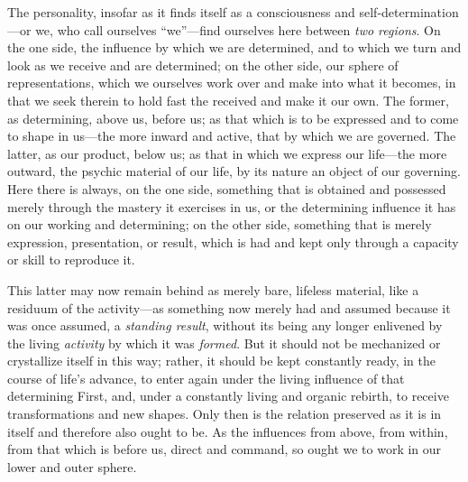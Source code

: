 \documentclass[12pt,a4paper]{book}
\begin{document}
The personality, insofar as it finds itself as a consciousness and
self-determination---or we, who call ourselves ``we''---find ourselves here
between \emph{two regions}. On the one side, the influence by which we are
determined, and to which we turn and look as we receive and are determined; on
the other side, our sphere of representations, which we ourselves work over and
make into what it becomes, in that we seek therein to hold fast the received and
make it our own. The former, as determining, above us, before us; as that which
is to be expressed and to come to shape in us---the more inward and active, that
by which we are governed. The latter, as our product, below us; as that in which
we express our life---the more outward, the psychic material of our life, by its
nature an object of our governing. Here there is always, on the one side,
something that is obtained and possessed merely through the mastery it exercises
in us, or the determining influence it has on our working and determining; on the
other side, something that is merely expression, presentation, or result, which
is had and kept only through a capacity or skill to reproduce it.

This latter may now remain behind as merely bare, lifeless material, like a
residuum of the activity---as something now merely had and assumed because it was
once assumed, a \emph{standing result}, without its being any longer enlivened by
the living \emph{activity} by which it was \emph{formed}. But it should not be
mechanized or crystallize itself in this way; rather, it should be kept
constantly ready, in the course of life's advance, to enter again under the
living influence of that determining First, and, under a constantly living and
organic rebirth, to receive transformations and new shapes. Only then is the
relation preserved as it is in itself and therefore also ought to be. As the
influences from above, from within, from that which is before us, direct and
command, so ought we to work in our lower and outer sphere.
\end{document}
